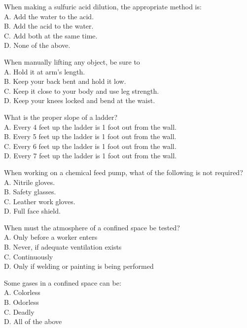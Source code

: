 When making a sulfuric acid dilution, the appropriate method is:\\
A. Add the water to the acid.\\
B. Add the acid to the water.\\
C. Add both at the same time.\\
D. None of the above.

When manually lifting any object, be sure to\\
A. Hold it at arm's length.\\
B. Keep your back bent and hold it low.\\
C. Keep it close to your body and use leg strength.\\
D. Keep your knees locked and bend at the waist.


What is the proper slope of a ladder?\\
A.	Every 4 feet up the ladder is 1 foot out from the wall.\\
B.	Every 5 feet up the ladder is 1 foot out from the wall. \\
C.	Every 6 feet up the ladder is 1 foot out from the wall.\\
D.	Every 7 feet up the ladder is 1 foot out from the wall.


When working on a chemical feed pump, what of the following is not required?\\
A.	Nitrile gloves.\\
B.	Safety glasses.\\
C.	Leather work gloves.\\
D.	Full face shield.

When must the atmosphere of a confined space be tested?\\
A.	Only before a worker enters\\
B.	Never, if adequate ventilation exists\\
C.	Continuously\\
D.	Only if welding or painting is being performed

Some gases in a confined space can be:\\
A.	Colorless\\
B.	Odorless\\
C.	Deadly\\
D.	All of the above


